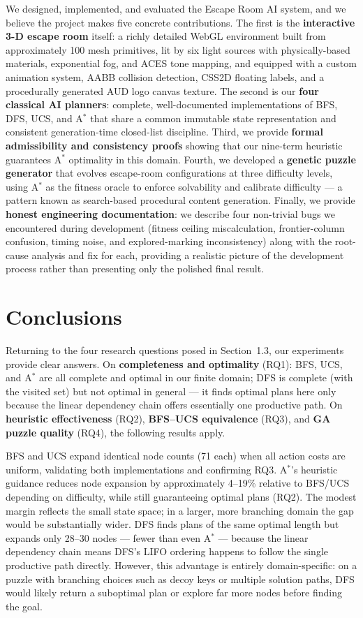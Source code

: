 \documentclass[12pt, a4paper]{report}
\begin{document}
We designed, implemented, and evaluated the Escape Room AI system, and we believe the project makes five concrete contributions.  The first is the \textbf{interactive 3-D escape room} itself: a richly detailed WebGL environment built from approximately 100 mesh primitives, lit by six light sources with physically-based materials, exponential fog, and ACES tone mapping, and equipped with a custom animation system, AABB collision detection, CSS2D floating labels, and a procedurally generated AUD logo canvas texture.  The second is our \textbf{four classical AI planners}: complete, well-documented implementations of BFS, DFS, UCS, and A$^{\ast}$ that share a common immutable state representation and consistent generation-time closed-list discipline.  Third, we provide \textbf{formal admissibility and consistency proofs} showing that our nine-term heuristic guarantees A$^{\ast}$ optimality in this domain.  Fourth, we developed a \textbf{genetic puzzle generator} that evolves escape-room configurations at three difficulty levels, using A$^{\ast}$ as the fitness oracle to enforce solvability and calibrate difficulty --- a pattern known as search-based procedural content generation.  Finally, we provide \textbf{honest engineering documentation}: we describe four non-trivial bugs we encountered during development (fitness ceiling miscalculation, frontier-column confusion, timing noise, and explored-marking inconsistency) along with the root-cause analysis and fix for each, providing a realistic picture of the development process rather than presenting only the polished final result.

\section{Conclusions}

Returning to the four research questions posed in Section~1.3, our experiments provide clear answers.  On \textbf{completeness and optimality} (RQ1): BFS, UCS, and A$^{\ast}$ are all complete and optimal in our finite domain; DFS is complete (with the visited set) but not optimal in general --- it finds optimal plans here only because the linear dependency chain offers essentially one productive path.  On \textbf{heuristic effectiveness} (RQ2), \textbf{BFS--UCS equivalence} (RQ3), and \textbf{GA puzzle quality} (RQ4), the following results apply.

BFS and UCS expand
identical node counts (71 each) when all action costs are uniform, validating both
implementations and confirming RQ3.  A$^{\ast}$'s heuristic guidance reduces node expansion by
approximately 4--19\% relative to BFS/UCS depending on difficulty, while still guaranteeing optimal plans (RQ2).  The modest margin reflects the small state space; in a larger, more branching domain the gap would be substantially wider.  DFS finds plans of the same optimal length but expands only 28--30 nodes --- fewer than even A$^{\ast}$ --- because the linear dependency chain means DFS's LIFO ordering happens to follow the single productive path directly.  However, this advantage is entirely domain-specific: on a puzzle with branching choices such as decoy keys or multiple solution paths, DFS would likely return a suboptimal plan or explore far more nodes before finding the goal.
\end{document}
